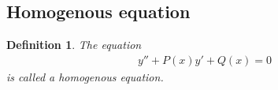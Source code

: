 \documentclass[oneside,11pt,pdftex,final]{book}%
\numberwithin{equation}{section}
\newtheorem{example}[theorem]{Example}
\newtheorem{definition}[theorem]{Definition}
\numberwithin{section}{chapter}
\numberwithin{equation}{chapter}
\newcommand{\R}{\mathbb{R}}
\begin{document}
%
%
%
%

\subsection{Homogenous equation}
\begin{definition}\label{def:2ndhomo}
	The equation \begin{align*}
		y''+P(x) y'+Q(x)=0
	\end{align*}  is called a homogenous equation.
\end{definition}
\end{document}
